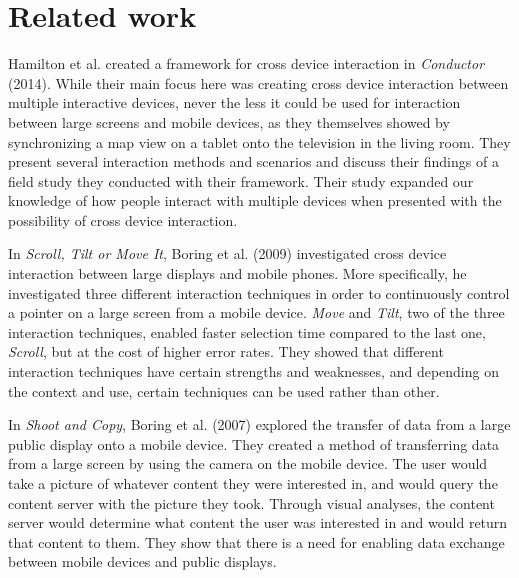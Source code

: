 \section{Related work} \label{sec:relatedwork}

Hamilton et al. created a framework for cross device interaction in \textit{Conductor} (2014).  While their main focus here was creating cross device interaction between multiple interactive devices, never the less it could be used for interaction between large screens and mobile devices, as they themselves showed by synchronizing a map view on a tablet onto the television in the living room. They present several interaction methods and scenarios and discuss their findings of a field study they conducted with their framework. Their study expanded our knowledge of how people interact with multiple devices when presented with the possibility of cross device interaction. 

In \textit{Scroll, Tilt or Move It}, Boring et al. (2009)  investigated cross device interaction between large displays and mobile phones. More specifically, he investigated three different interaction techniques in order to continuously control a pointer on a large screen from a mobile device. \textit{Move} and \textit{Tilt}, two of the three interaction techniques, enabled faster selection time compared to the last one, \textit{Scroll}, but at the cost of higher error rates. They showed that different interaction techniques have certain strengths and weaknesses, and depending on the context and use, certain techniques can be used rather than other. 

In \textit{Shoot and Copy}, Boring et al. (2007)  explored the transfer of data from a large public display onto a mobile device. They created a method of transferring data from a large screen by using the camera on the mobile device. The user would take a picture of whatever content they were interested in, and would query the content server with the picture they took. Through visual analyses, the content server would determine what content the user was interested in and would return that content to them. They show that there is a need for enabling data exchange between mobile devices and public displays.  